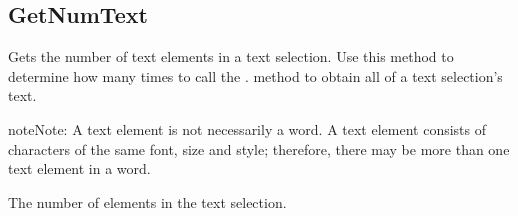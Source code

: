 \documentclass[letterpaper,12pt,english,openany,oneside]{sphinxmanual}
\begin{document}
\subsection{GetNumText}
\label{\detokenize{IAC_API_OLE_Objects:getnumtext}}
Gets the number of text elements in a text selection. Use this method to determine how many times to call the .  method to obtain all of a text selection’s text.

\begin{sphinxadmonition}{note}{Note:}
A text element is not necessarily a word. A text element consists of characters of the same font, size and style; therefore, there may be more than one text element in a word.
\end{sphinxadmonition}


\begin{sphinxVerbatim}[commandchars=\\\{\}]
 
\end{sphinxVerbatim}


The number of elements in the text selection.
\end{document}
